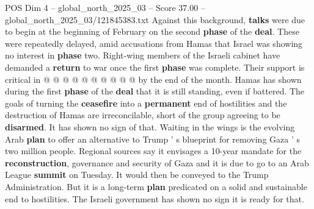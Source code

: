 \begin{textsample}{POS Dim 4 – global\_north\_2025\_03 – Score 37.00 – global\_north\_2025\_03/121845383.txt}
Against this background, \textbf{talks} were due to begin at the beginning of February on the second \textbf{phase} of the \textbf{deal}.
These were repeatedly delayed, amid accusations from Hamas that Israel was showing no interest in \textbf{phase} two.
Right-wing members of the Israeli cabinet have demanded a \textbf{return} to war once the first \textbf{phase} was complete.
Their support is critical in @ @ @ @ @ @ @ @ @ @ by the end of the month.
Hamas has shown during the first \textbf{phase} of the \textbf{deal} that it is still standing, even if battered.
The goals of turning the \textbf{ceasefire} into a \textbf{permanent} end of hostilities and the destruction of Hamas are irreconcilable, short of the group agreeing to be \textbf{disarmed}.
It has shown no sign of that.
Waiting in the wings is the evolving Arab \textbf{plan} to offer an alternative to Trump ' s blueprint for removing Gaza ' s two million people.
Regional sources say it envisages a 10-year mandate for the \textbf{reconstruction}, governance and security of Gaza and it is due to go to an Arab League \textbf{summit} on Tuesday.
It would then be conveyed to the Trump Administration.
But it is a long-term \textbf{plan} predicated on a solid and sustainable end to hostilities.
The Israeli government has shown no sign it is ready for that.

\end{textsample}
